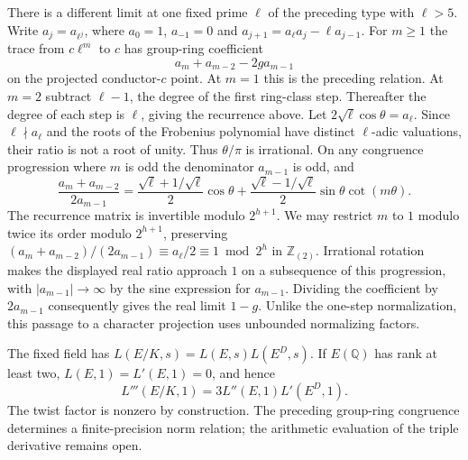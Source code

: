 \documentclass[11pt]{article}
\newcommand{\Q}{\mathbb Q}\newcommand{\Z}{\mathbb Z}\newcommand{\F}{\mathbb F}
\begin{document}
There is a different limit at one fixed prime $\ell$ of the preceding
type with $\ell>5$. Write $a_j=a_{\ell^j}$, where $a_0=1$,
$a_{-1}=0$ and $a_{j+1}=a_\ell a_j-\ell a_{j-1}$. For $m\ge1$
the trace from $c\ell^m$ to $c$ has group-ring coefficient
\[
                    a_m+a_{m-2}-2g a_{m-1}
\]
on the projected conductor-$c$ point. At $m=1$ this is the preceding
relation. At $m=2$ subtract $\ell-1$, the degree of the first
ring-class step. Thereafter the degree of each step is $\ell$, giving
the recurrence above. Let $2\sqrt{\ell}\cos\theta=a_\ell$. Since
$\ell\nmid a_\ell$ and the roots of the Frobenius polynomial have
distinct $\ell$-adic valuations, their ratio is not a root of unity.
Thus $\theta/\pi$ is irrational. On any congruence progression where
$m$ is odd the denominator $a_{m-1}$ is odd, and
\[
\frac{a_m+a_{m-2}}{2a_{m-1}}
=\frac{\sqrt\ell+1/\sqrt\ell}{2}\cos\theta+
 \frac{\sqrt\ell-1/\sqrt\ell}{2}\sin\theta\cot(m\theta).
\]
The recurrence matrix is invertible modulo $2^{h+1}$. We may restrict
$m$ to $1$ modulo twice its order modulo $2^{h+1}$, preserving
$(a_m+a_{m-2})/(2a_{m-1})\equiv a_\ell/2\equiv1\bmod 2^h$
in $\Z_{(2)}$. Irrational rotation makes the displayed real ratio
approach $1$ on a subsequence of this progression, with
$|a_{m-1}|\to\infty$ by the sine expression for $a_{m-1}$.
Dividing the coefficient by $2a_{m-1}$ consequently gives the real
limit $1-g$. Unlike the one-step normalization, this passage to a
character projection uses unbounded normalizing factors.

The fixed field has $L(E/K,s)=L(E,s)L(E^D,s)$. If $E(\Q)$ has rank
at least two, $L(E,1)=L'(E,1)=0$, and hence
\[
                 L'''(E/K,1)=3 L''(E,1)L'(E^D,1).
\]
The twist factor is nonzero by construction. The preceding
group-ring congruence determines a finite-precision norm relation;
the arithmetic evaluation of the triple derivative remains open.
\end{document}
